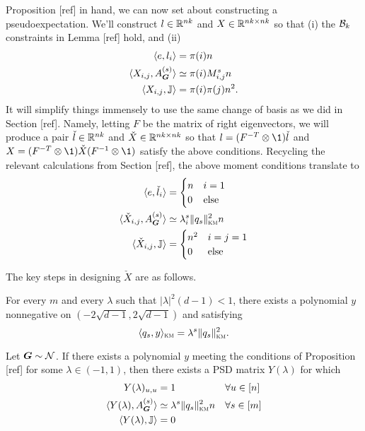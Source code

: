 Proposition [ref] in hand, we can now set about constructing a pseudoexpectation. We'll construct $l\in \mathbb{R}^{nk}$ and $X \in \mathbb{R}^{nk\times nk}$ so that (i) the $\mathcal{B}_k$ constraints in Lemma [ref] hold, and (ii)
\begin{align*}
    \langle e, l_i \rangle &= \pi(i)n \\
    \langle X_{i,j}, A^{(s)}_{\boldsymbol{G}} \rangle &\simeq \pi(i)M_{i,j}^s n \\
    \langle X_{i,j}, \mathbb{J} \rangle &= \pi(i)\pi(j)n^2. 
\end{align*}
It will simplify things immensely to use the same change of basis as we did in Section [ref]. Namely, letting $F$ be the matrix of right eigenvectors, we will produce a pair $\check l \in \mathbb{R}^{nk}$ and $\check X \in \mathbb{R}^{nk\times nk}$ so that $l = (F^{-T} \otimes \1) \check l$ and $X = (F^{-T}\otimes \1) \check X (F^{-1} \otimes \1)$ satisfy the above conditions. Recycling the relevant calculations from Section [ref], the above moment conditions translate to
\begin{align*}
    \langle e, \check l_i \rangle &= \begin{cases} n & i = 1 \\ 0 & \text{else} \end{cases} \\
    \langle \check X_{i,j}, A^{(s)}_{\boldsymbol{G}} \rangle &\simeq \lambda_i^s \|q_s\|^2_{\textsc{km}} n \\
    \langle \check X_{i,j}, \mathbb{J} \rangle &= \begin{cases} n^2 & i=j = 1 \\ 
    0 & \text{else} \end{cases}
\end{align*}

The key steps in designing $\check X$ are as follows.
%
\begin{proposition}
    For every $m$ and every $\lambda$ such that $|\lambda|^2(d-1) < 1$, there exists a polynomial $y$ nonnegative on $(-2\sqrt{d-1},2\sqrt{d-1})$ and satisfying
    $$
        \langle q_s,y \rangle_{\textsc{km}} = \lambda^s\|q_s\|^2_{\textsc{km}}.
    $$
\end{proposition}
\begin{proposition}
    Let $\boldsymbol{G} \sim \mathcal{N}$. If there exists a polynomial $y$ meeting the conditions of Proposition [ref] for some $\lambda \in (-1,1)$, then there exists a PSD matrix $Y(\lambda)$ for which
    \begin{align*}
        Y(\lambda)_{u,u} &= 1 & & \forall u\in[n] \\
         \langle Y(\lambda), A^{(s)}_{\boldsymbol{G}} \rangle &\simeq \lambda^s \|q_s\|^2_{\textsc{km}}n & & \forall s \in[m] \\
         \langle Y(\lambda),\mathbb{J} \rangle &= 0
    \end{align*}
\end{proposition}


